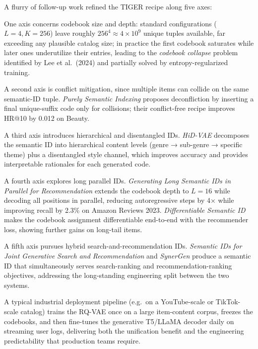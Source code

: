 \documentclass{article}
\begin{document}
A flurry of follow-up work refined the TIGER recipe along five axes:

One axis concerns codebook size and depth: standard configurations (\(L=4, K=256\)) leave roughly \(256^4 \approx 4 \times 10^9\) unique tuples available, far exceeding any plausible catalog size; in practice the first codebook saturates while later ones underutilize their entries, leading to the \emph{codebook collapse} problem identified by Lee et al.~(2024) and partially solved by entropy-regularized training.

A second axis is conflict mitigation, since multiple items can collide on the same semantic-ID tuple. \emph{Purely Semantic Indexing} \citep{zhang2025purelysemanticinde} proposes deconfliction by inserting a final unique-suffix code only for collisions; their conflict-free recipe improves HR@10 by 0.012 on Beauty.

A third axis introduces hierarchical and disentangled IDs. \emph{HiD-VAE} \citep{fang2025hidvaeinterpretabl} decomposes the semantic ID into hierarchical content levels (genre → sub-genre → specific theme) plus a disentangled style channel, which improves accuracy and provides interpretable rationales for each generated code.

A fourth axis explores long parallel IDs. \emph{Generating Long Semantic IDs in Parallel for Recommendation} \citep{hou2025generatinglongsema} extends the codebook depth to \(L=16\) while decoding all positions in parallel, reducing autoregressive steps by 4× while improving recall by 2.3\% on Amazon Reviews 2023. \emph{Differentiable Semantic ID} \citep{fu2026differentiablesema} makes the codebook assignment differentiable end-to-end with the recommender loss, showing further gains on long-tail items.

A fifth axis pursues hybrid search-and-recommendation IDs. \emph{Semantic IDs for Joint Generative Search and Recommendation} \citep{penha2025semanticidsforjoin} and \emph{SynerGen} \citep{gao2025synergencontextual} produce a semantic ID that simultaneously serves search-ranking and recommendation-ranking objectives, addressing the long-standing engineering split between the two systems.

A typical industrial deployment pipeline (e.g.~on a YouTube-scale or TikTok-scale catalog) trains the RQ-VAE once on a large item-content corpus, freezes the codebooks, and then fine-tunes the generative T5/LLaMA decoder daily on streaming user logs, delivering both the unification benefit and the engineering predictability that production teams require.
\end{document}

